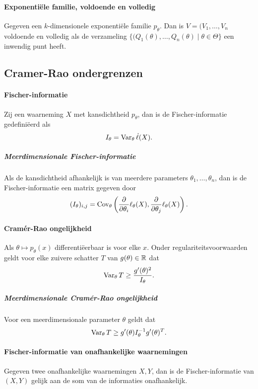 \paragraph{Exponentiële familie, voldoende en volledig} Gegeven een \(k\)-dimensionele exponentiële familie \(p_{\theta}\). Dan is \(V=(V_{1},\dots,V_{n}\) voldoende en volledig als de verzameling \(\{(Q_{1}(\theta),\dots,Q_{n}(\theta)\mid\theta\in\Theta\}\) een inwendig punt heeft.

\subsection{Cramer-Rao ondergrenzen}
\paragraph{Fischer-informatie} Zij een waarneming \(X\) met kansdichtheid
\(p_{\theta}\), dan is de Fischer-informatie gedefiniëerd als
\[
    I_{\theta}=\operatorname{Var}_{\theta}\dot{\ell}(X).
\]
\subparagraph{Meerdimensionale Fischer-informatie} Als de kansdichtheid afhankelijk is van meerdere parameters \(\theta_{1},\dots,\theta_{n}\), dan is de Fischer-informatie een matrix gegeven door
\[
    (I_{\theta})_{i,j}=\operatorname{Cov}_{\theta}\left(\frac{\partial}{\partial\theta_{i}}\ell_{\theta}(X),\frac{\partial}{\partial\theta_{j}}\ell_{\theta}(X)\right).
\]

\paragraph{Cramér-Rao ongelijkheid} Als \(\theta\mapsto p_{\theta}(x)\) differentiëerbaar is voor elke \(x\). Onder regulariteitsvoorwaarden geldt voor elke zuivere schatter \(T\) van \(g(\theta)\in\mathbb{R}\) dat
\[
    \operatorname{Var}_{\theta}T\geq\frac{g'(\theta)^{2}}{I_{\theta}}.
\]

\subparagraph{Meerdimensionale Cramér-Rao ongelijkheid} Voor een meerdimensionale parameter \(\theta\) geldt dat
\[
    \operatorname{Var}_{\theta}T\geq g'(\theta)I_{\theta}^{-1}g'(\theta)^{T}.
\]

\paragraph{Fischer-informatie van onafhankelijke waarnemingen} Gegeven twee onafhankelijke waarnemingen \(X,Y\), dan is de Fischer-informatie van \((X,Y)\) gelijk aan de som van de informaties onafhankelijk.